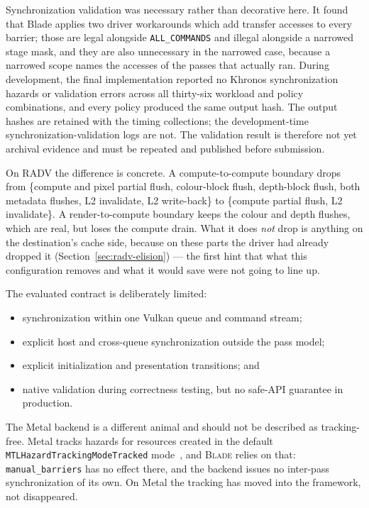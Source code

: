 \documentclass[10pt,twocolumn]{article}
\newcommand{\blade}{\textsc{Blade}}
\begin{document}
Synchronization validation was necessary rather than decorative here. It found
that Blade applies two driver workarounds which add transfer accesses to every
barrier; those are legal alongside \texttt{ALL\_COMMANDS} and illegal alongside
a narrowed stage mask, and they are also unnecessary in the narrowed case,
because a narrowed scope names the accesses of the passes that actually ran.
During development, the final implementation reported no Khronos
synchronization hazards or validation errors across all thirty-six workload
and policy combinations, and every policy produced the same output hash. The
output hashes are retained with the timing collections; the development-time
synchronization-validation logs are not. The validation result is therefore
not yet archival evidence and must be repeated and published before
submission.

On RADV the difference is concrete. A compute-to-compute boundary drops from
\{compute and pixel partial flush, colour-block flush, depth-block flush, both
metadata flushes, L2 invalidate, L2 write-back\} to \{compute partial flush, L2
invalidate\}. A render-to-compute boundary keeps the colour and depth flushes,
which are real, but loses the compute drain. What it does \emph{not} drop is
anything on the destination's cache side, because on these parts the driver had
already dropped it (Section~\ref{sec:radv-elision}) --- the first hint that
what this configuration removes and what it would save were not going to line
up.

The evaluated contract is deliberately limited:

\begin{itemize}
  \item synchronization within one Vulkan queue and command stream;
  \item explicit host and cross-queue synchronization outside the pass model;
  \item explicit initialization and presentation transitions; and
  \item native validation during correctness testing, but no safe-API
  guarantee in production.
\end{itemize}

The Metal backend is a different animal and should not be described as
tracking-free. Metal tracks hazards for resources created in the default
\texttt{MTLHazardTrackingModeTracked} mode~\cite{metal-hazard-tracking}, and
\blade{} relies on that: \texttt{manual\_barriers} has no effect there, and the
backend issues no inter-pass synchronization of its own. On Metal the tracking
has moved into the framework, not disappeared.
\end{document}
